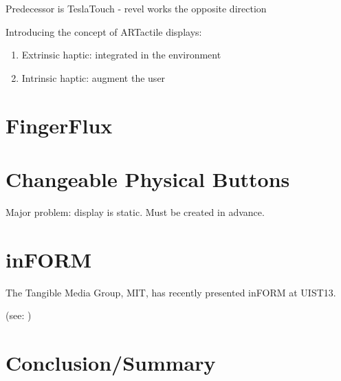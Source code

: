 Predecessor is TeslaTouch - revel works the opposite direction

Introducing the concept of ARTactile displays: 
\begin{enumerate}
	\item Extrinsic haptic: integrated in the environment
    \item Intrinsic haptic: augment the user
\end{enumerate}


\section*{FingerFlux}

\section*{Changeable Physical Buttons}

Major problem: display is static. Must be created in advance.

\section*{inFORM}

The Tangible Media Group, MIT, has recently presented inFORM at UIST13. 

(see: \cite{follmer2013inform})

\section*{Conclusion/Summary}
